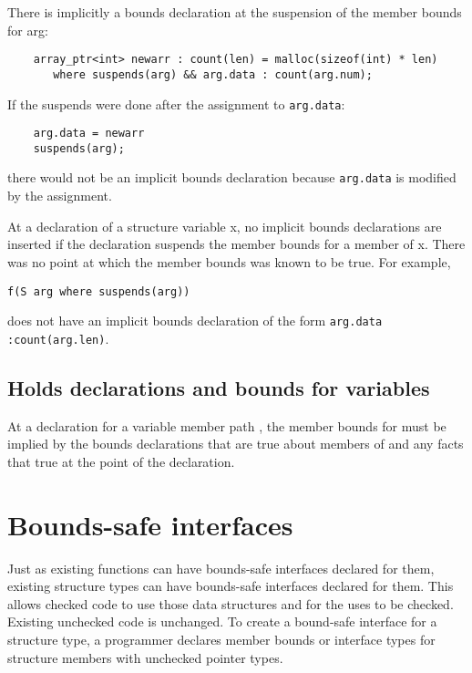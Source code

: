There is implicitly a bounds declaration at the suspension of the member
bounds for arg:

\begin{lstlisting}
    array_ptr<int> newarr : count(len) = malloc(sizeof(int) * len)
       where suspends(arg) && arg.data : count(arg.num);
\end{lstlisting}

If the suspends were done after the assignment to \texttt{arg.data}:

\begin{lstlisting}
    arg.data = newarr
    suspends(arg);
\end{lstlisting}

there would not be an implicit bounds declaration because \texttt{arg.data} is
modified by the assignment.

At a declaration of a structure variable x, no implicit bounds
declarations are inserted if the declaration suspends the member bounds
for a member of x. There was no point at which the member bounds was
known to be true. For example,

\begin{lstlisting}
f(S arg where suspends(arg))
\end{lstlisting}

does not have an implicit bounds declaration of the form \verb|arg.data :count(arg.len)|.

\subsection{Holds declarations and bounds for variables}

At a  declaration for a variable member path ,
the member bounds for  must be implied by the bounds
declarations that are true about members of  and any facts that 
true at the point of the  declaration.

\section{Bounds-safe interfaces}
\label{section:structure-bounds-safe-interfaces}

Just as existing functions can have bounds-safe interfaces declared for
them, existing structure types can have bounds-safe interfaces declared
for them. This allows checked code to use those data structures and for
the uses to be checked. Existing unchecked code is unchanged.
To create a bound-safe interface for a structure type, a programmer
declares member bounds or interface types for structure members with
unchecked pointer types.

